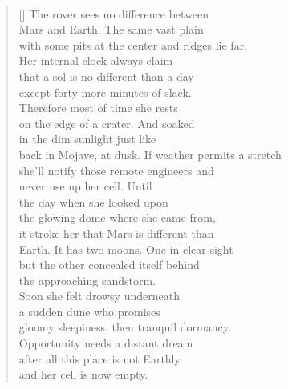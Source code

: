 \documentclass{book}
\begin{document}
\newpage
\renewcommand{\poemtitlefont}{\normalfont\large\itshape\centering}
\poemtitle{\textcolor[RGB]{175,25,25}{Opportunity's mission}}
\hspace*{\fill} \\
\settowidth{\versewidth}{back in Mojave, at dusk. If weather permits a stretch}
\begin{verse}[\versewidth]
    The rover sees no difference between\\
    Mars and Earth. The same vast plain\\
    with some pits at the center and ridges lie far. \\
    Her internal clock always claim\\
    that a sol is no different than a day\\
    except forty more minutes of slack.\\
    Therefore most of time she rests\\
    on the edge of a crater. And soaked\\
    in the dim sunlight just like\\
    back in Mojave, at dusk. If weather permits a stretch \\
    she'll notify those remote engineers and\\
    never use up her cell. Until\\
    the day when she looked upon\\
    the glowing dome where she came from,\\
    it stroke her that Mars is different than\\
    Earth. It has two moons. One in clear sight\\
    but the other concealed itself behind\\
    the approaching sandstorm.\\
    Soon she felt drowsy underneath\\
    a sudden dune who promises\\
    gloomy sleepiness, then tranquil dormancy.\\
    Opportunity needs a distant dream\\
    after all this place is not Earthly\\
    and her cell is now empty.\\
\end{verse}

\newpage
\end{document}
